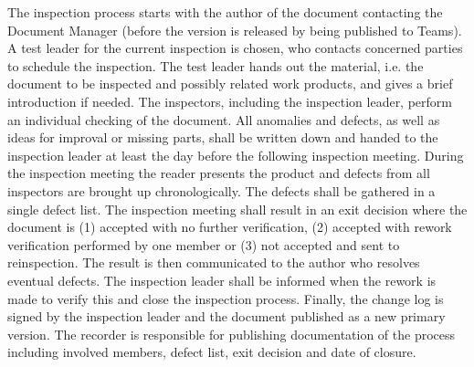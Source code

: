 	The inspection process starts with the author of the document contacting the Document Manager (before the version is released by being published to Teams). A test leader for the current inspection is chosen, who contacts concerned parties to schedule the inspection. The test leader hands out the material, i.e. the document to be inspected and possibly related work products, and gives a brief introduction if needed. The inspectors, including the inspection leader, perform an individual checking of the document. All anomalies and defects, as well as ideas for improval or missing parts, shall be written down and handed to the inspection leader at least the day before the following inspection meeting. During the inspection meeting the reader presents the product and defects from all inspectors are  brought up chronologically. The defects shall be gathered in a single defect list. The inspection meeting shall result in an exit decision where the document is (1) accepted with no further verification, (2) accepted with rework verification performed by one member or (3) not accepted and sent to reinspection. The result is then communicated to the author who resolves eventual defects. The inspection leader shall be informed when the rework is made to verify this and close the inspection process. Finally, the change log is signed by the inspection leader and the document published as a new primary version. The recorder is responsible for publishing documentation of the process including involved members, defect list, exit decision and date of closure.